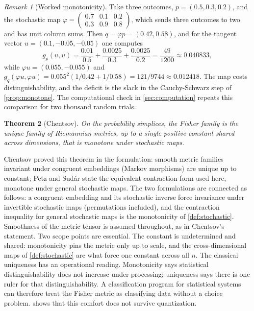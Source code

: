 \documentclass[11pt,letterpaper]{article}
\newtheorem{theorem}{Theorem}[section]
\theoremstyle{definition}
\theoremstyle{remark}
\newtheorem{remark}[theorem]{Remark}
\begin{document}
\begin{remark}[Worked monotonicity]
\label{rem:worked-monotone}
Take three outcomes, $p = (0.5, 0.3, 0.2)$, and the stochastic map $\varphi = \left(\begin{smallmatrix} 0.7 & 0.1 & 0.2 \\ 0.3 & 0.9 & 0.8 \end{smallmatrix}\right)$, which sends three outcomes to two and has unit column sums. Then $q = \varphi p = (0.42, 0.58)$, and for the tangent vector $u = (0.1, -0.05, -0.05)$ one computes
\begin{equation}
g_p(u, u) = \frac{0.01}{0.5} + \frac{0.0025}{0.3} + \frac{0.0025}{0.2} = \frac{49}{1200} \approx 0.040833,
\end{equation}
while $\varphi u = (0.055, -0.055)$ and $g_q(\varphi u, \varphi u) = 0.055^2 (1/0.42 + 1/0.58) = 121/9744 \approx 0.012418$. The map costs distinguishability, and the deficit is the slack in the Cauchy-Schwarz step of \cref{prop:monotone}. The computational check in \cref{sec:computation} repeats this comparison for two thousand random trials.
\end{remark}

\begin{theorem}[Chentsov]
\label{thm:chentsov}
On the probability simplices, the Fisher family is the unique family of Riemannian metrics, up to a single positive constant shared across dimensions, that is monotone under stochastic maps.
\end{theorem}

Chentsov proved this theorem in the formulation: smooth metric families invariant under congruent embeddings (Markov morphisms) are unique up to constant; Petz and Sud\'ar \cite{petz-sudar} state the equivalent contraction form used here, monotone under general stochastic maps. The two formulations are connected as follows: a congruent embedding and its stochastic inverse force invariance under invertible stochastic maps (permutations included), and the contraction inequality for general stochastic maps is the monotonicity of \cref{def:stochastic}. Smoothness of the metric tensor is assumed throughout, as in Chentsov's statement. Two scope points are essential. The constant is undetermined and shared: monotonicity pins the metric only up to scale, and the cross-dimensional maps of \cref{def:stochastic} are what force one constant across all $n$. The classical uniqueness has an operational reading. Monotonicity says statistical distinguishability does not increase under processing; uniqueness says there is one ruler for that distinguishability. A classification program for statistical systems can therefore treat the Fisher metric as classifying data without a choice problem.  shows that this comfort does not survive quantization.
\end{document}
